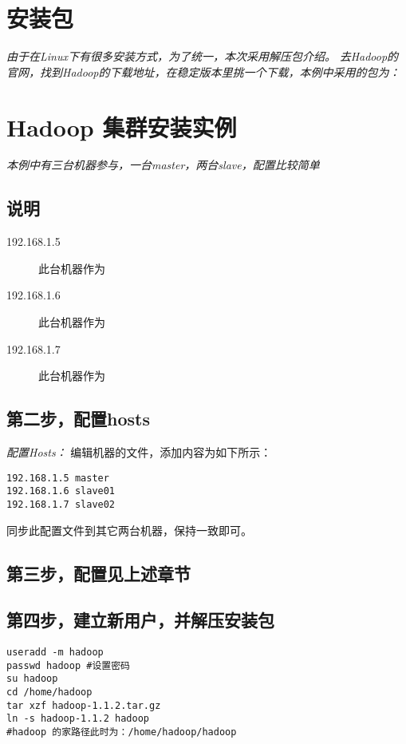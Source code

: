 \documentclass{article}
\begin{document}
\section{安装包}
\textit{由于在Linux下有很多安装方式，为了统一，本次采用解压包介绍。}
\textit{去Hadoop的官网，找到Hadoop的下载地址，在稳定版本里挑一个下载，本例中采用的包为：}


\section{Hadoop 集群安装实例}
\textit{本例中有三台机器参与，一台master，两台slave，配置比较简单}

\subsection{说明}
\begin{description}
\item[192.168.1.5] 此台机器作为
\item[192.168.1.6] 此台机器作为
\item[192.168.1.7] 此台机器作为
\end{description}

\subsection{第二步，配置hosts}
\textit{配置Hosts：}
编辑机器的文件，添加内容为如下所示：

\begin{verbatim}
192.168.1.5 master
192.168.1.6 slave01
192.168.1.7 slave02
\end{verbatim}

同步此配置文件到其它两台机器，保持一致即可。

\subsection{第三步，配置见上述章节}

\subsection{第四步，建立新用户，并解压安装包}
\begin{verbatim}
useradd -m hadoop
passwd hadoop #设置密码
su hadoop
cd /home/hadoop
tar xzf hadoop-1.1.2.tar.gz 
ln -s hadoop-1.1.2 hadoop
#hadoop 的家路径此时为：/home/hadoop/hadoop
\end{verbatim}
\end{document}
